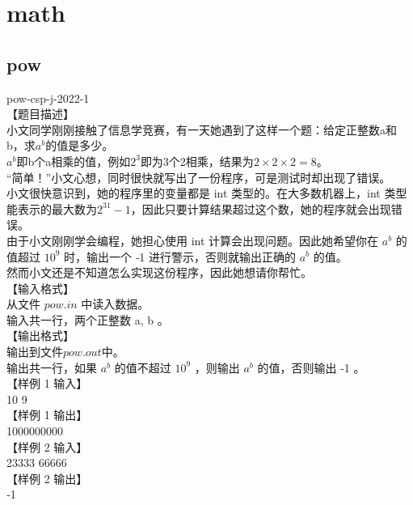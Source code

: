 \documentclass[12pt,twiside,a4paper]{ctexbook}
\numberwithin{chapter}{part}
\begin{document}

\chapter{math}
\section{pow}
pow-csp-j-2022-1\\
【题目描述】\\
小文同学刚刚接触了信息学竞赛，有一天她遇到了这样一个题：给定正整数a和b，求$a^b$的值是多少。\\
$a^b$即b个a相乘的值，例如$2^3$即为3个2相乘，结果为$2\times2\times2=8$。\\
“简单！”小文心想，同时很快就写出了一份程序，可是测试时却出现了错误。\\
小文很快意识到，她的程序里的变量都是 int 类型的。在大多数机器上，int 类型
能表示的最大数为$2^{31}−1$，因此只要计算结果超过这个数，她的程序就会出现错误。\\
由于小文刚刚学会编程，她担心使用 int 计算会出现问题。因此她希望你在 $a^b$ 的
值超过 $10^9$ 时，输出一个 ‐1 进行警示，否则就输出正确的 $a^b$ 的值。\\
然而小文还是不知道怎么实现这份程序，因此她想请你帮忙。\\
【输入格式】\\
从文件 $pow.in$ 中读入数据。\\
输入共一行，两个正整数 a, b 。\\
【输出格式】\\
输出到文件$pow.out$中。\\
输出共一行，如果 $a^b$ 的值不超过 $10^9$ ，则输出 $a^b$ 的值，否则输出 ‐1 。\\
【样例 1 输入】\\
10 9\\
【样例 1 输出】\\
1000000000\\
【样例 2 输入】\\
23333 66666\\
【样例 2 输出】\\
‐1\\
\end{document}
